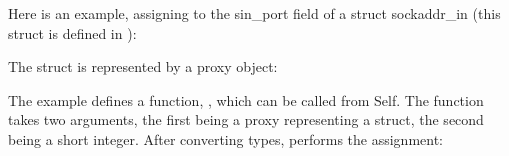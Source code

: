 \documentclass[letterpaper,10pt,english]{sphinxmanual}
\begin{document}
\begin{sphinxVerbatim}[commandchars=\\\{\}]
   
   
\end{sphinxVerbatim}

Here is an example, assigning to the sin\_port field of a struct sockaddr\_in (this struct is defined
in ):

\begin{sphinxVerbatim}[commandchars=\\\{\}]
  
               
             
       
                \PYG{p}{[}\PYG{p}{]}
\end{sphinxVerbatim}

The struct is represented by a proxy object:

\begin{sphinxVerbatim}[commandchars=\\\{\}]
   
   
\end{sphinxVerbatim}

The  example defines a function, , which can be called from
Self. The function takes two arguments, the first being a proxy representing a 
struct, the second being a short integer. After converting types,  performs
the assignment:
\end{document}
